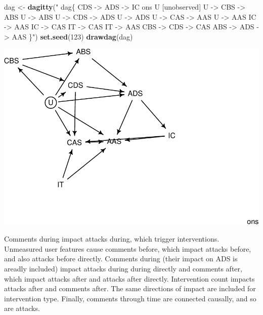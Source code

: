 \documentclass[10pt,dvipsnames,enabledeprecatedfontcommands]{scrartcl}
\newenvironment{Shaded}{\begin{snugshade}}{\end{snugshade}}
\newcommand{\KeywordTok}[1]{\textcolor[rgb]{0.13,0.29,0.53}{\textbf{#1}}}
\newcommand{\DecValTok}[1]{\textcolor[rgb]{0.00,0.00,0.81}{#1}}
\newcommand{\StringTok}[1]{\textcolor[rgb]{0.31,0.60,0.02}{#1}}
\newcommand{\NormalTok}[1]{#1}
\begin{document}
\begin{Shaded}
\begin{Highlighting}[]
\NormalTok{dag <-}\StringTok{ }\KeywordTok{dagitty}\NormalTok{(}\StringTok{"}
\StringTok{  dag\{}
\StringTok{  CDS -> ADS -> IC  ons}
\StringTok{               U [unobserved]   }
\StringTok{               U -> CBS -> ABS  }
\StringTok{               U -> ABS        }
\StringTok{               U -> CDS -> ADS  }
\StringTok{               U -> ADS         }
\StringTok{               U -> CAS -> AAS    }
\StringTok{               U -> AAS                        }
\StringTok{               IC -> AAS        }
\StringTok{               IC -> CAS        }
\StringTok{               IT -> CAS        }
\StringTok{               IT -> AAS}
\StringTok{               CBS -> CDS -> CAS}
\StringTok{               ABS -> ADS -> AAS}
\StringTok{               \}"}\NormalTok{)}
\KeywordTok{set.seed}\NormalTok{(}\DecValTok{123}\NormalTok{)}
\KeywordTok{drawdag}\NormalTok{(dag)}
\end{Highlighting}
\end{Shaded}

\begin{center}\includegraphics[width=1\linewidth]{bayesianReport_files/figure-latex/dag1-1} \end{center}

\normalsize

Comments during impact attacks during, which trigger interventions.
Unmeasured user features cause comments before, which impact attacks
before, and also attacks before directly. Comments during (their impact
on ADS is areadly included) impact attacks during during directly and
comments after, which impact attacks after and attacks after directly.
Intervention count impacts attacks after and comments after. The same
directions of impact are included for intervention type. Finally,
comments through time are connected causally, and so are attacks.
\end{document}
